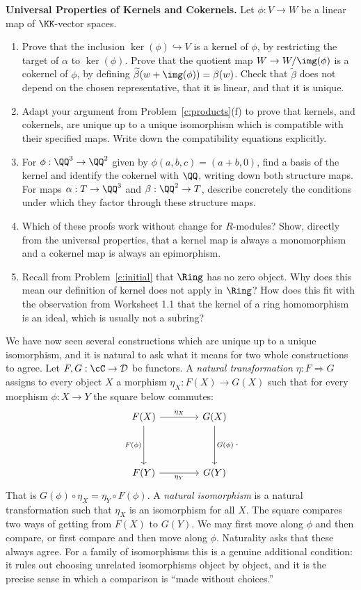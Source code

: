 \documentclass[12pt,reqno]{amsart}
\begin{document}
\begin{problems}
\item\label{c:kernels} \textbf{Universal Properties of Kernels and Cokernels.} Let $\phi:V\to W$ be a linear map of $\KK$-vector spaces.
\begin{enumerate}
\item Prove that the inclusion $\ker(\phi)\hookrightarrow V$ is a kernel of $\phi$, by restricting the target of $\alpha$ to $\ker(\phi)$. Prove that the quotient map $W\to W/\img(\phi)$ is a cokernel of $\phi$, by defining $\widetilde\beta(w+\img(\phi))=\beta(w)$. Check that $\widetilde\beta$ does not depend on the chosen representative, that it is linear, and that it is unique.
\item Adapt your argument from Problem~\ref{c:products}(f) to prove that kernels, and cokernels, are unique up to a unique isomorphism which is compatible with their specified maps. Write down the compatibility equations explicitly.
\item For $\phi:\QQ^3\to\QQ^2$ given by $\phi(a,b,c)=(a+b,0)$, find a basis of the kernel and identify the cokernel with $\QQ$, writing down both structure maps. For maps $\alpha:T\to\QQ^3$ and $\beta:\QQ^2\to T$, describe concretely the conditions under which they factor through these structure maps.
\item Which of these proofs work without change for $R$-modules? Show, directly from the universal properties, that a kernel map is always a monomorphism and a cokernel map is always an epimorphism.
\item Recall from Problem~\ref{c:initial} that $\Ring$ has no zero object. Why does this mean our definition of kernel does not apply in $\Ring$? How does this fit with the observation from Worksheet 1.1 that the kernel of a ring homomorphism is an ideal, which is usually not a subring?
\end{enumerate}
\end{problems}

\hrulefill

We have now seen several constructions which are unique up to a unique isomorphism, and it is natural to ask what it means for two whole constructions to agree. Let $F,G:\cC\to\mathcal D$ be functors. A \emph{natural transformation} $\eta:F\Rightarrow G$ assigns to every object $X$ a morphism $\eta_X:F(X)\to G(X)$ such that for every morphism $\phi:X\to Y$ the square below commutes:
\[
\begin{tikzcd}[row sep=4em,column sep=4em]
F(X) \arrow[r,"\eta_X"] \arrow[d,"F(\phi)"'] & G(X) \arrow[d,"G(\phi)"] \\
F(Y) \arrow[r,"\eta_Y"'] & G(Y)
\end{tikzcd}.
\]
That is $G(\phi)\circ\eta_X=\eta_Y\circ F(\phi)$. A \emph{natural isomorphism} is a natural transformation such that $\eta_X$ is an isomorphism for all $X$.  The square compares two ways of getting from $F(X)$ to $G(Y)$. We may first move along $\phi$ and then compare, or first compare and then move along $\phi$. Naturality asks that these always agree. For a family of isomorphisms this is a genuine additional condition: it rules out choosing unrelated isomorphisms object by object, and it is the precise sense in which a comparison is ``made without choices.''
\end{document}
